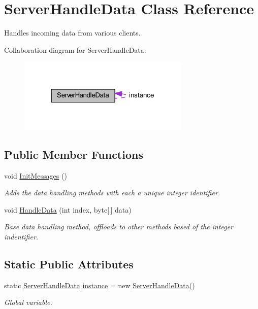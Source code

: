 \hypertarget{class_server_handle_data}{}\section{Server\+Handle\+Data Class Reference}
\label{class_server_handle_data}


Handles incoming data from various clients.  




Collaboration diagram for Server\+Handle\+Data\+:\nopagebreak
\begin{figure}[H]
\begin{center}
\leavevmode
\includegraphics[width=232pt]{class_server_handle_data__coll__graph}
\end{center}
\end{figure}
\subsection*{Public Member Functions}
\begin{DoxyCompactItemize}
\item 
void \mbox{\hyperlink{class_server_handle_data_a81cc7ca39a0389d206ad6547a729f9f0}{Init\+Messages}} ()
\begin{DoxyCompactList}\small\item\em Adds the data handling methods with each a unique integer identifier. \end{DoxyCompactList}\item 
void \mbox{\hyperlink{class_server_handle_data_adf1710050ac6dca514e7be03c9bf7d89}{Handle\+Data}} (int index, byte\mbox{[}$\,$\mbox{]} data)
\begin{DoxyCompactList}\small\item\em Base data handling method, offloads to other methods based of the integer indentifier. \end{DoxyCompactList}\end{DoxyCompactItemize}
\subsection*{Static Public Attributes}
\begin{DoxyCompactItemize}
\item 
static \mbox{\hyperlink{class_server_handle_data}{Server\+Handle\+Data}} \mbox{\hyperlink{class_server_handle_data_a53d7acb38385f73c248f5d3e3168f4d1}{instance}} = new \mbox{\hyperlink{class_server_handle_data}{Server\+Handle\+Data}}()
\begin{DoxyCompactList}\small\item\em Global variable. \end{DoxyCompactList}\end{DoxyCompactItemize}
